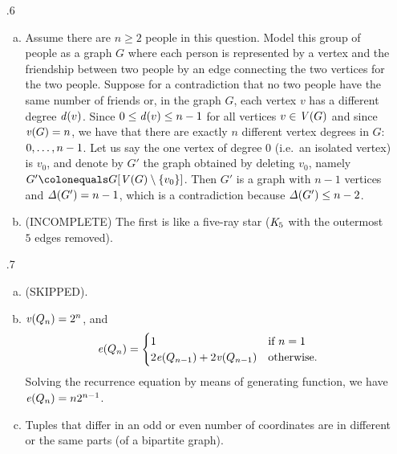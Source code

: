 \begin{enumerate}[1.]
\begin{description}
\end{description}
%
\item[\thesection.6]
\begin{enumerate}[a)]
\item Assume there are $n \geq 2$ people in this question. Model this group of people as a graph $G$ where each person is represented by a vertex and the friendship between two people by an edge connecting the two vertices for the two people. Suppose for a contradiction that no two people have the same number of friends or, in the graph $G$, each vertex $v$ has a different degree $\mathit{d}(v)$. Since $0 \leq \mathit{d}(v) \leq n - 1$ for all vertices $v \in \mathit{V}(G)$ and since $\mathit{v}(G) = n$, we have that there are exactly $n$ different vertex degrees in $G$: $0, \ldots, n - 1$. Let us say the one vertex of degree $0$ (i.e.~an isolated vertex) is $v_0$, and denote by $G'$ the graph obtained by deleting $v_0$, namely $G' \defas \subgraph{G}{\vset(G) \setminus \sete{v_0}}$. Then $G'$ is a graph with $n - 1$ vertices and $\mathit{\Delta}(G') = n - 1$, which is a contradiction because $\mathit{\Delta}(G') \leq n - 2$.
\item (INCOMPLETE) The first is like a five-ray star ($\clique[5]$ with the outermost $5$ edges removed).
\end{enumerate}
%
\item[\thesection.7]
\begin{enumerate}[a)]
\item (SKIPPED).
\item $\mathit{v}(Q_n) = 2^n$, and
\[
\enum(Q_n) = 
\begin{cases}
1 & \mbox{if \mathmode{n = 1}} \cr
2\enum(Q_{n - 1}) + 2\vnum(Q_{n - 1}) & \mbox{otherwise}. \cr
\end{cases}
\]
Solving the recurrence equation by means of generating function, we have $\mathit{e}(Q_n) = n2^{n - 1}$.
\item Tuples that differ in an odd or even number of coordinates are in different or the same parts (of a bipartite graph).
\end{enumerate}
%
\end{enumerate}
